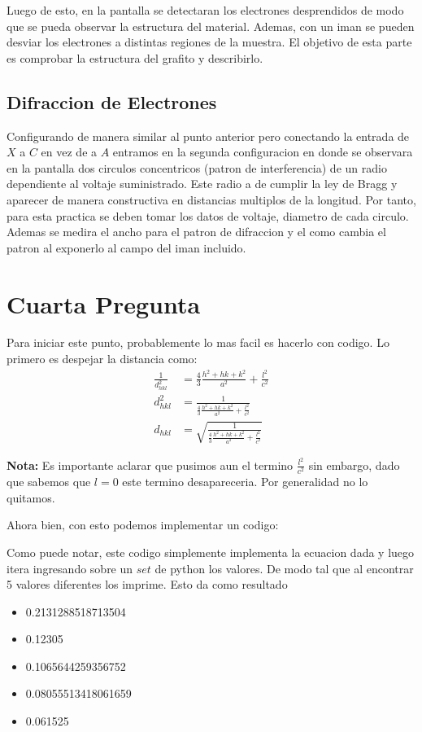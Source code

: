 \documentclass[a4paper, amsfonts, amssymb, amsmath, reprint, showkeys, nofootinbib, twoside]{revtex4-1}
\begin{document}
Luego de esto, en la pantalla se detectaran los electrones desprendidos de modo que se pueda observar la estructura del material. Ademas, con un iman se pueden desviar los electrones a distintas regiones de la muestra. El objetivo de esta parte es comprobar la estructura del grafito y describirlo.

\subsection{Difraccion de Electrones}

Configurando de manera similar al punto anterior pero conectando la entrada de $X$ a $C$ en vez de a $A$ entramos en la segunda configuracion en donde se observara en la pantalla dos circulos concentricos (patron de interferencia) de un radio dependiente al voltaje suministrado. Este radio a de cumplir la ley de Bragg y aparecer de manera constructiva en distancias multiplos de la longitud. Por tanto, para esta practica se deben tomar los datos de voltaje, diametro de cada circulo. Ademas se medira el ancho para el patron de difraccion y el como cambia el patron al exponerlo al campo del iman incluido. 

\section{Cuarta Pregunta}

Para iniciar este punto, probablemente lo mas facil es hacerlo con codigo. Lo primero es despejar la distancia como:
\begin{align*}
  \frac{1}{d_{hkl}^2} &= \frac{4}{3}\frac{h^2 + hk + k^2}{a^2} + \frac{l^2}{c^2}\\
  d_{hkl}^2 &= \frac{1}{\frac{4}{3}\frac{h^2 + hk + k^2}{a^2} + \frac{l^2}{c^2}}\\
  d_{hkl} &= \sqrt{\frac{1}{\frac{4}{3}\frac{h^2 + hk + k^2}{a^2} + \frac{l^2}{c^2}}}
\end{align*}

\textbf{Nota:} Es importante aclarar que pusimos aun el termino $\frac{l^2}{c^2}$ sin embargo, dado que sabemos que $l = 0$ este termino desapareceria. Por generalidad no lo quitamos.

Ahora bien, con esto podemos implementar un codigo:



Como puede notar, este codigo simplemente implementa la ecuacion dada y luego itera ingresando sobre un $set$ de python los valores. De modo tal que al encontrar 5 valores diferentes los imprime. Esto da como resultado
\begin{itemize}
  \item 0.2131288518713504
  \item 0.12305
  \item 0.1065644259356752
  \item 0.08055513418061659
  \item 0.061525
\end{itemize}
\end{document}
